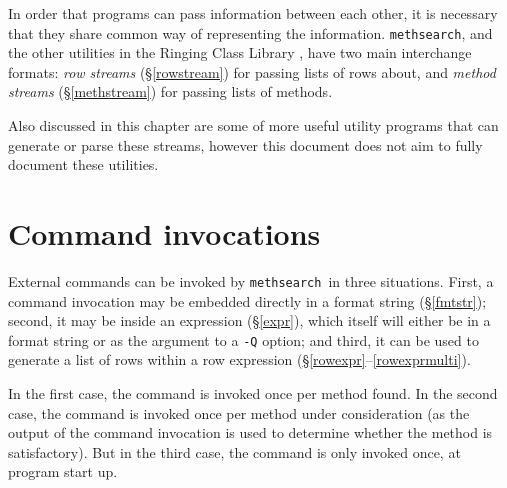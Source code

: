 \documentclass[a4paper,11pt,oneside]{book}
\makeatletter
\newcommand{\oi}[1]{\index{#1@{\hspace*{-\optwidth}\texttt{-}\texttt{#1}}}}
\def\methsearch{\texttt{meth\-search}}
\newcommand{\sref}[1]{\hyperref[#1]{\S\ref{#1}}}
\makeatother
\begin{document}
In order that programs can pass information between each other, 
it is necessary that they share common way of representing the information.  
\methsearch, and the other utilities in the Ringing Class Library%
, have two main interchange formats:
\textit{row streams} (\sref{rowstream}) 
for passing lists of rows about, and 
\textit{method streams} (\sref{methstream}) 
for passing lists of methods.%

Also discussed in this chapter are some of more useful utility programs
that can generate or parse these streams, however this document does not
aim to fully document these utilities.

\section{Command invocations}\label{cmdinv}

External commands can be invoked by \methsearch\ in three situations.
First, a command invocation may be embedded directly in a format string
(\sref{fmtstr}); second, it may be inside an expression (\sref{expr}),
which itself will either be in a format string or as the argument to a 
\verb+-Q+\oi{Q} option; and third, it can be used to 
generate a list of rows within a row expression 
(\sref{rowexpr}--\ref{rowexprmulti}).  

In the first case, the command is invoked once per method found.
In the second case, the command is invoked once per method under consideration
(as the output of the command invocation is used to determine whether the
method is satisfactory).  But in the third case, the command is only
invoked once, at program start up.
\end{document}

